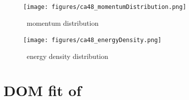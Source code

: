 \begin{figure}[H]
    \centering
    \texttt{[image: figures/ca48\_momentumDistribution.png]}
    \caption{\caEight\ momentum distribution}
    \label{DOMFitData_ca48_momentumDistribution}
\end{figure}

\begin{figure}[H]
    \centering
    \texttt{[image: figures/ca48\_energyDensity.png]}
    \caption{\caEight\ energy density distribution}
    \label{DOMFitData_ca48_energyDensity}
\end{figure}

\section{DOM fit of \niEight}

